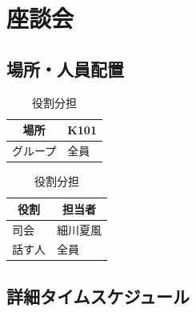\newpage
\section{座談会}  %

\subsection{場所・人員配置}
\begin{table}[h]
  \centering
  \begin{minipage}[t]{0.48\columnwidth}
    \centering
    \caption{場所・該当グループ}
    \begin{tabular}{cl}
      \hline
      場所 & K101 \\
      \hline
      グループ & 全員 \\
      \hline
    \end{tabular}
  \end{minipage}
  \begin{minipage}[t]{0.48\columnwidth}
    \centering
    \caption{役割分担}
    \begin{tabular}{ll}
      \hline
      \multicolumn{1}{c}{役割} & \multicolumn{1}{c}{担当者} \\
      \hline
      司会 & 細川夏風 \\
      話す人 & 全員 \\
      \hline
    \end{tabular}
  \end{minipage}
\end{table}

\subsection{詳細タイムスケジュール}
\vspace{0.5em}
\fontsize{8pt}{12pt}\selectfont

